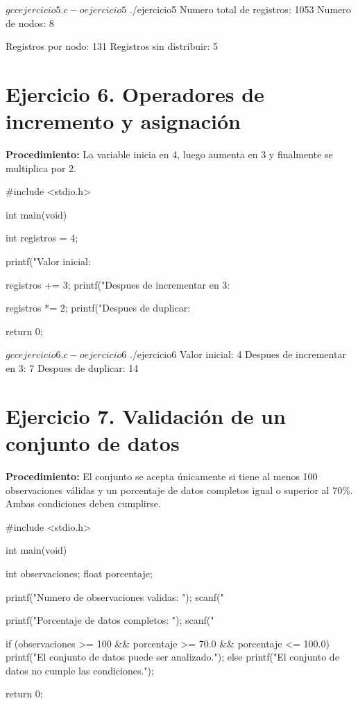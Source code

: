 \documentclass[11pt, a4paper]{article}
\begin{document}
\begin{terminalout}
$ gcc ejercicio5.c -o ejercicio5
$ ./ejercicio5
Numero total de registros: 1053
Numero de nodos: 8

Registros por nodo: 131
Registros sin distribuir: 5
\end{terminalout}

\newpage

\section*{Ejercicio 6. Operadores de incremento y asignación}
\textbf{Procedimiento:} La variable inicia en 4, luego aumenta en 3 y finalmente se multiplica por 2.

\begin{codebox}[title={CÓDIGO FUENTE EN C: Ejercicio 6}]
#include <stdio.h>

int main(void) {
    int registros = 4;

    printf("Valor inicial: %

    registros += 3;
    printf("Despues de incrementar en 3: %

    registros *= 2;
    printf("Despues de duplicar: %

    return 0;
}
\end{codebox}

\begin{terminalout}
$ gcc ejercicio6.c -o ejercicio6
$ ./ejercicio6
Valor inicial: 4
Despues de incrementar en 3: 7
Despues de duplicar: 14
\end{terminalout}

\newpage

\section*{Ejercicio 7. Validación de un conjunto de datos}
\textbf{Procedimiento:} El conjunto se acepta únicamente si tiene al menos 100 observaciones válidas y un porcentaje de datos completos igual o superior al 70\%. Ambas condiciones deben cumplirse.

\begin{codebox}[title={CÓDIGO FUENTE EN C: Ejercicio 7}]
#include <stdio.h>

int main(void) {
    int observaciones;
    float porcentaje;

    printf("Numero de observaciones validas: ");
    scanf("%

    printf("Porcentaje de datos completos: ");
    scanf("%

    if (observaciones >= 100 && porcentaje >= 70.0 && porcentaje <= 100.0) {
        printf("El conjunto de datos puede ser analizado.\n");
    } else {
        printf("El conjunto de datos no cumple las condiciones.\n");
    }

    return 0;
}
\end{codebox}
\end{document}
